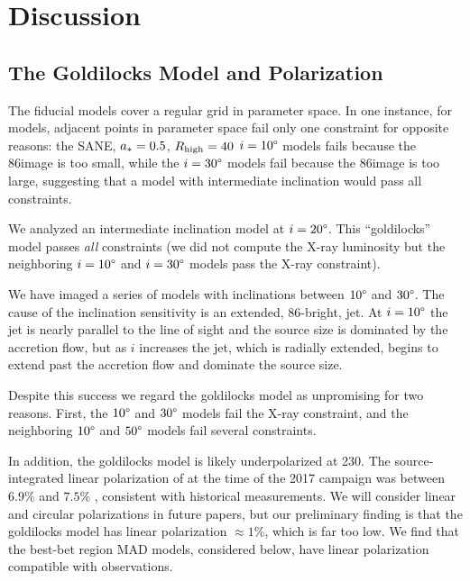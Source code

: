 \section{Discussion}
\label{sec:discussions}

\subsection{The Goldilocks Model and Polarization}\label{sec:goldilocks}

The fiducial models cover a regular grid in parameter space.
In one instance, for \kharma models, adjacent points in parameter space fail only one constraint for opposite reasons: the SANE, $a_* = 0.5$, $R_\mathrm{high} = 40$ $i = 10\degree$ models fails because the 86\GHz image is too small, while the $i = 30\degree$ models fail because the 86\GHz image is too large, suggesting  that a model with intermediate inclination would pass all constraints.

We analyzed an intermediate inclination model at $i = 20\degree$.
This ``goldilocks'' model passes {\em all} constraints (we did not compute the X-ray luminosity but the neighboring $i=10\degree$ and $i=30\degree$ models pass the X-ray constraint).

We have imaged a series of \kharma models with inclinations between $10\degree$ and $30\degree$.
The cause of the inclination sensitivity is an extended, 86\GHz-bright, jet.
At $i = 10\degree$ the jet is nearly parallel to the line of sight and the source size is dominated by the accretion flow, but as $i$ increases the jet, which is radially extended, begins to extend past the accretion flow and dominate the source size.

Despite this success we regard the goldilocks model as unpromising for two reasons.
First, the $10\degree$ and $30\degree$ \bhac models fail the X-ray constraint, and the neighboring $10\degree$ and $50\degree$ \hamr models fail several constraints.

In addition, the goldilocks model is likely underpolarized at 230\GHz.
The source-integrated linear polarization of \sgra at the time of the 2017 campaign was between $6.9\%$ and $7.5$\% \citep{2021ApJ...910L..14G}, consistent with historical measurements.
We will consider linear and circular polarizations in future papers, but our preliminary finding is that the goldilocks model has linear polarization $\approx 1$\%, which is far too low. We find that the best-bet region MAD models, considered below, have linear polarization compatible with observations.

